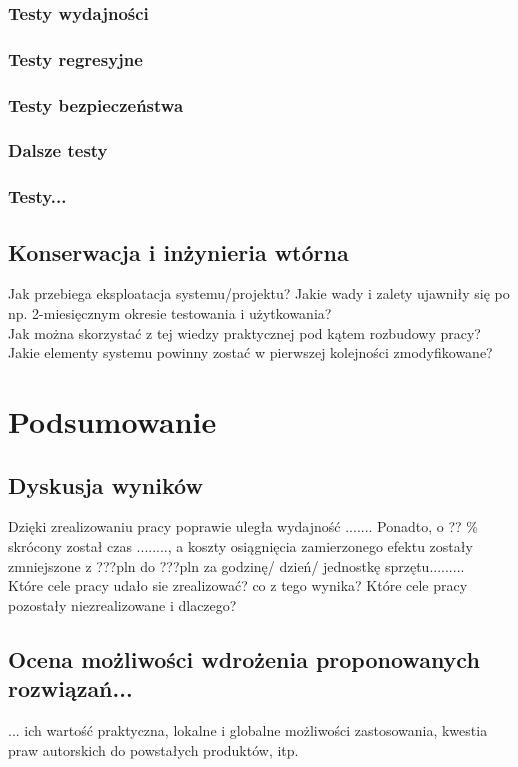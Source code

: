 \documentclass[12pt]{report}
\begin{document}
\subsection{Testy wydajności}
\subsection{Testy regresyjne}
\subsection{Testy bezpieczeństwa}
\subsection{Dalsze testy}
\subsection{Testy...}

\section{Konserwacja i inżynieria wtórna}
Jak przebiega eksploatacja systemu/projektu? Jakie wady i zalety ujawniły się po
np. 2-miesięcznym okresie testowania i użytkowania? \\
\indent Jak można skorzystać z tej wiedzy praktycznej pod kątem roz\-bu\-do\-wy pracy? Jakie elementy systemu powinny zostać w pierwszej kolejności zmodyfikowane?  

\chapter{Podsumowanie}
\section{Dyskusja wyników}
Dzięki zrealizowaniu pracy poprawie uległa wydajność ....... Ponadto, o ?? \%
skrócony został czas ........, a koszty osiągnięcia zamierzonego efektu zostały
zmniejszone z ???pln do ???pln za godzinę/ dzień/ jednostkę sprzętu.........\\
\indent Które cele pracy udało sie zrealizować? co z tego wynika? Które cele
pracy pozostały niezrealizowane i dlaczego? 

\section[Ocena możliwości wdrożenia...]{Ocena możliwości wdrożenia proponowanych
\newline rozwiązań...}
... ich wartość praktyczna, lokalne i globalne możliwości zastosowania, kwestia
praw autorskich do powstałych produktów, itp. 
\end{document}
